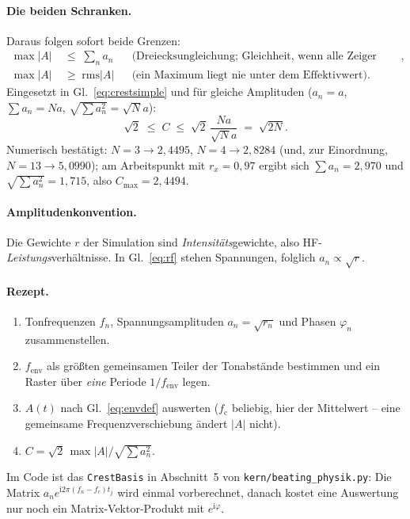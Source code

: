 \documentclass[11pt,a4paper]{article}
\newcommand{\crest}{\ensuremath{C}}
\begin{document}
\paragraph{Die beiden Schranken.}
Daraus folgen sofort beide Grenzen:
\begin{align}
  \max|A| \;&\le\; \sum_n a_n
  &&\text{(Dreiecksungleichung; Gleichheit, wenn alle Zeiger ausgerichtet sind)},\\
  \max|A| \;&\ge\; \mathrm{rms}|A|
  &&\text{(ein Maximum liegt nie unter dem Effektivwert)} .
\end{align}
Eingesetzt in Gl.~\eqref{eq:crestsimple} und für gleiche Amplituden
($a_n = a$, $\sum a_n = Na$, $\sqrt{\sum a_n^2} = \sqrt{N}a$):
\begin{equation}
  \sqrt{2} \;\le\; \crest \;\le\; \sqrt{2}\,\frac{Na}{\sqrt{N}a} \;=\; \sqrt{2N} .
  \label{eq:sqrt2n}
\end{equation}
Numerisch bestätigt: $N=3\rightarrow 2{,}4495$, $N=4\rightarrow 2{,}8284$
(und, zur Einordnung, $N=13\rightarrow 5{,}0990$); am Arbeitspunkt mit
$r_x=0{,}97$ ergibt sich $\sum a_n = 2{,}970$ und
$\sqrt{\sum a_n^2}=1{,}715$, also $\crest_{\max}=2{,}4494$.

\paragraph{Amplitudenkonvention.}
Die Gewichte $r$ der Simulation sind \emph{Intensitäts}gewichte, also
HF-\emph{Leistungs}verhältnisse. In Gl.~\eqref{eq:rf} stehen Spannungen,
folglich $a_n \propto \sqrt{r}$.

\paragraph{Rezept.}
\begin{enumerate}\itemsep0.15em
  \item Tonfrequenzen $f_n$, Spannungsamplituden $a_n=\sqrt{r_n}$ und Phasen
        $\varphi_n$ zusammenstellen.
  \item $f_\mathrm{env}$ als größten gemeinsamen Teiler der Tonabstände
        bestimmen und ein Raster über \emph{eine} Periode $1/f_\mathrm{env}$ legen.
  \item $A(t)$ nach Gl.~\eqref{eq:envdef} auswerten ($f_\mathrm{c}$ beliebig,
        hier der Mittelwert -- eine gemeinsame Frequenzverschiebung ändert
        $|A|$ nicht).
  \item $\crest = \sqrt{2}\,\max|A| \big/ \sqrt{\sum a_n^2}$.
\end{enumerate}
Im Code ist das \texttt{CrestBasis} in Abschnitt~5 von
\texttt{kern/beating\_physik.py}: Die Matrix
$a_n e^{\mathrm{i}2\pi(f_n-f_\mathrm{c})t_j}$ wird einmal vorberechnet,
danach kostet eine Auswertung nur noch ein Matrix-Vektor-Produkt mit
$e^{\mathrm{i}\varphi}$.
\end{document}
